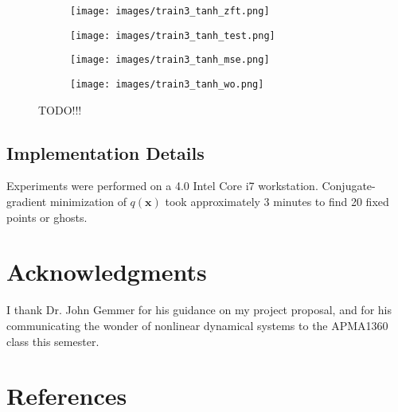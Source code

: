 \documentclass{article} %
\newcommand{\bf}[1]{\mathbf{#1}}
\newcommand{\x}{\bf{x}}
\begin{document}
\begin{figure}
\centering
\begin{subfigure}{.5\textwidth}
  \centering
  \texttt{[image: images/train3\_tanh\_zft.png]}
  \caption{}
\end{subfigure}%
\begin{subfigure}{.5\textwidth}
  \centering
  \texttt{[image: images/train3\_tanh\_test.png]}
  \caption{}
\end{subfigure}
\begin{subfigure}{.5\textwidth}
  \centering
  \texttt{[image: images/train3\_tanh\_mse.png]}
  \caption{}
\end{subfigure}%
\begin{subfigure}{.5\textwidth}
  \centering
  \texttt{[image: images/train3\_tanh\_wo.png]}
  \caption{}
\end{subfigure}
\caption{TODO!!!}
\label{fig:test}
\end{figure}

\subsection{Implementation Details}

Experiments were performed on a 4.0 Intel Core i7 workstation. Conjugate-gradient minimization of $q(\x)$ took approximately 3 minutes to find 20 fixed points or ghosts.

\section*{Acknowledgments}

I thank Dr. John Gemmer for his guidance on my project proposal, and for his communicating the wonder of nonlinear dynamical systems to the APMA1360 class this semester.



\section*{References}
\end{document}
